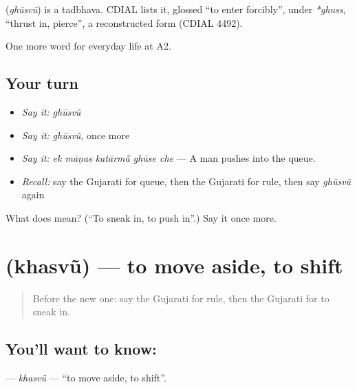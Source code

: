 \begin{cousinweb}
\textbf{} (\emph{ghūsvũ}) is a tadbhava. CDIAL lists it, glossed \textquotedblleft{}to enter forcibly\textquotedblright{}, under \emph{*ghuss}, \textquotedblleft{}thrust in, pierce\textquotedblright{}, a reconstructed form (CDIAL 4492).
\end{cousinweb}

\begin{grammarlens}[title={What you've built}]
One more word for everyday life at A2.
\end{grammarlens}

\subsection*{Your turn}
\begin{itemize}
\raggedright
  \item \emph{Say it:} \emph{ghūsvũ}
  \item \emph{Say it:} \emph{ghūsvũ}, once more
  \item \emph{Say it:} \emph{ek māṇas katārmā̃ ghūse che} — A man pushes into the queue.
  \item \emph{Recall:} say the Gujarati for queue, then the Gujarati for rule, then say \emph{ghūsvũ} again
\end{itemize}

\begin{tcolorbox}[breakable,colback=teal!4,colframe=teal!35!black,title={Before you move on}]
What does  mean? (\textquotedblleft{}To sneak in, to push in\textquotedblright{}.) Say it once more.
\end{tcolorbox}
\section[\texorpdfstring{\gu{ખસવું} (khasvũ)}{ખસવું (khasvũ)}]{ (khasvũ) — to move aside, to shift}

\label{lesson:GU-C199-khasvu}



\begin{quote}
Before the new one: say the Gujarati for rule, then the Gujarati for to sneak in.
\end{quote}

\subsection*{You'll want to know: }
\textbf{} — \emph{khasvũ} — \textquotedblleft{}to move aside, to shift\textquotedblright{}.

